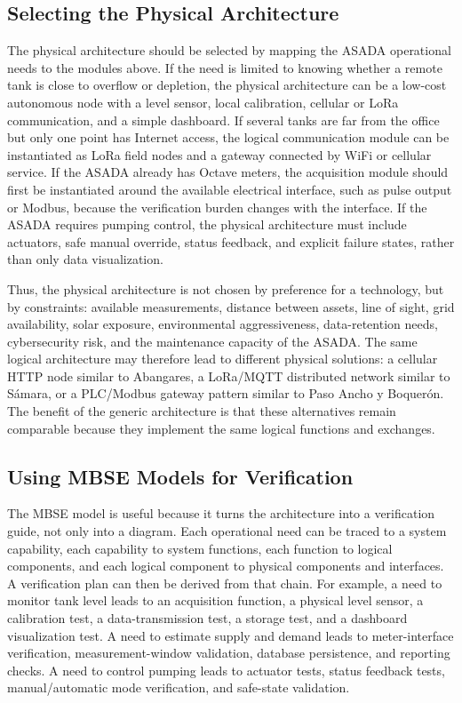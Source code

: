 \documentclass[conference]{IEEEtran}
\begin{document}
\subsection{Selecting the Physical Architecture}
The physical architecture should be selected by mapping the ASADA operational needs to the modules above. If the need is limited to knowing whether a remote tank is close to overflow or depletion, the physical architecture can be a low-cost autonomous node with a level sensor, local calibration, cellular or LoRa communication, and a simple dashboard. If several tanks are far from the office but only one point has Internet access, the logical communication module can be instantiated as LoRa field nodes and a gateway connected by WiFi or cellular service. If the ASADA already has Octave meters, the acquisition module should first be instantiated around the available electrical interface, such as pulse output or Modbus, because the verification burden changes with the interface. If the ASADA requires pumping control, the physical architecture must include actuators, safe manual override, status feedback, and explicit failure states, rather than only data visualization.

Thus, the physical architecture is not chosen by preference for a technology, but by constraints: available measurements, distance between assets, line of sight, grid availability, solar exposure, environmental aggressiveness, data-retention needs, cybersecurity risk, and the maintenance capacity of the ASADA. The same logical architecture may therefore lead to different physical solutions: a cellular HTTP node similar to Abangares, a LoRa/MQTT distributed network similar to Sámara, or a PLC/Modbus gateway pattern similar to Paso Ancho y Boquerón. The benefit of the generic architecture is that these alternatives remain comparable because they implement the same logical functions and exchanges.

\subsection{Using MBSE Models for Verification}
The MBSE model is useful because it turns the architecture into a verification guide, not only into a diagram. Each operational need can be traced to a system capability, each capability to system functions, each function to logical components, and each logical component to physical components and interfaces. A verification plan can then be derived from that chain. For example, a need to monitor tank level leads to an acquisition function, a physical level sensor, a calibration test, a data-transmission test, a storage test, and a dashboard visualization test. A need to estimate supply and demand leads to meter-interface verification, measurement-window validation, database persistence, and reporting checks. A need to control pumping leads to actuator tests, status feedback tests, manual/automatic mode verification, and safe-state validation.
\end{document}
